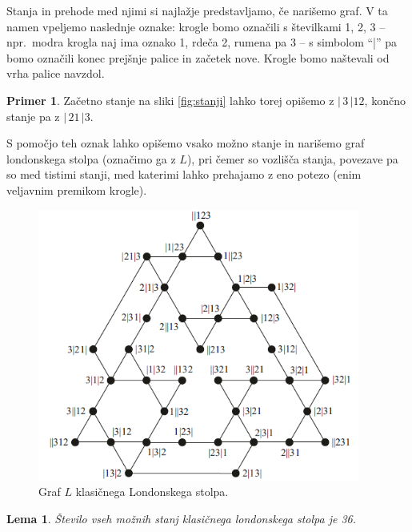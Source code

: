 \documentclass[12pt,a4paper]{amsart}
\theoremstyle{definition} %
\newtheorem{primer}[definicija]{Primer}
\theoremstyle{plain} %
\newtheorem{lema}[definicija]{Lema}
\newcommand{\bd}{\ensuremath{|\,}}
\newcommand{\ed}{\ensuremath{\,|}}
\begin{document}
Stanja in prehode med njimi si najlažje predstavljamo, če narišemo graf. V ta namen vpeljemo naslednje oznake:
krogle bomo označili s številkami 1, 2, 3 -- npr.\ modra krogla naj ima oznako 1, rdeča 2, rumena pa 3 -- s simbolom ``|'' pa bomo označili konec prejšnje palice in začetek nove. Krogle bomo naštevali od vrha palice navzdol.

\begin{primer}
    Začetno stanje na sliki \ref{fig:stanji} lahko torej opišemo z $\bd 3 \ed 12$, končno stanje pa z $\bd 21 \ed 3$.
\end{primer}

S pomočjo teh oznak lahko opišemo vsako možno stanje in narišemo graf londonskega stolpa (označimo ga z $L$), pri čemer so vozlišča stanja, povezave pa so med tistimi stanji, med katerimi lahko prehajamo z eno potezo (enim veljavnim premikom krogle).

\begin{figure}[h!]
    \includegraphics[width=300pt]{img/tolgraph.png}
    \caption{Graf $L$ klasičnega Londonskega stolpa.}
    \label{fig:tolgraph}
\end{figure}

\begin{lema}
    \label{lem:stanja-klas-lond}
    Število vseh možnih stanj klasičnega londonskega stolpa je 36.
\end{lema}
\end{document}
